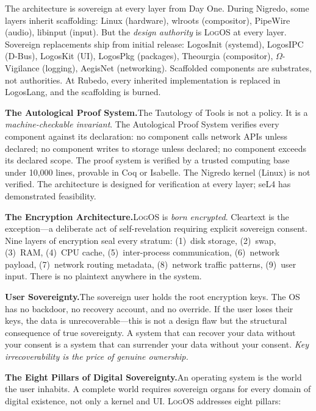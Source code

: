 \documentclass[11pt, oneside]{article}
\newcommand{\sep}{%
    \begin{center}\vspace{2pt}%
    \textcolor{LogosGray}{\textemdash\textemdash\textemdash}%
    \vspace{2pt}\end{center}%
}
\newcommand{\LogOS}{\textnormal{\textsc{LogOS}}}
\begin{document}
\sep

The architecture is sovereign at every layer from Day One. During
Nigredo, some layers inherit scaffolding: Linux (hardware), wlroots
(compositor), PipeWire (audio), libinput (input). But the \textit{design
authority} is \LogOS{} at every layer. Sovereign replacements ship from
initial release: LogosInit (systemd), LogosIPC (D-Bus), LogosKit (UI),
LogosPkg (packages), Theourgia (compositor), $\Omega$-Vigilance
(logging), AegisNet (networking). Scaffolded components are substrates,
not authorities. At Rubedo, every inherited implementation is replaced
in LogosLang, and the scaffolding is burned.

\sep

\noindent\textbf{The Autological Proof System.}\quad The Tautology of
Tools is not a policy. It is a \textit{machine-checkable invariant}. The
Autological Proof System verifies every component against its
declaration: no component calls network APIs unless declared; no
component writes to storage unless declared; no component exceeds its
declared scope. The proof system is verified by a trusted computing base
under 10,000 lines, provable in Coq or Isabelle. The Nigredo kernel
(Linux) is not verified. The architecture is designed
for verification at every layer; seL4 has demonstrated feasibility.

\sep

\noindent\textbf{The Encryption Architecture.}\quad \LogOS{} is
\textit{born encrypted}. Cleartext is the exception---a deliberate act of
self-revelation requiring explicit sovereign consent. Nine layers of
encryption seal every stratum: (1)~disk storage, (2)~swap, (3)~RAM,
(4)~CPU cache, (5)~inter-process communication, (6)~network payload,
(7)~network routing metadata, (8)~network traffic patterns, (9)~user
input. There is no plaintext anywhere in the system.

\medskip
\noindent\textbf{User Sovereignty.}\quad The sovereign user holds the
root encryption keys. The OS has no backdoor, no recovery account, and
no override. If the user loses their keys, the data is
unrecoverable---this is not a design flaw but the structural consequence
of true sovereignty. A system that can recover your data without your
consent is a system that can surrender your data without your consent.
\textit{Key irrecoverability is the price of genuine ownership.}

\sep

\noindent\textbf{The Eight Pillars of Digital Sovereignty.}\quad An
operating system is the world the user inhabits. A complete world
requires sovereign organs for every domain of digital existence, not
only a kernel and UI. \LogOS{} addresses eight pillars:
\end{document}
